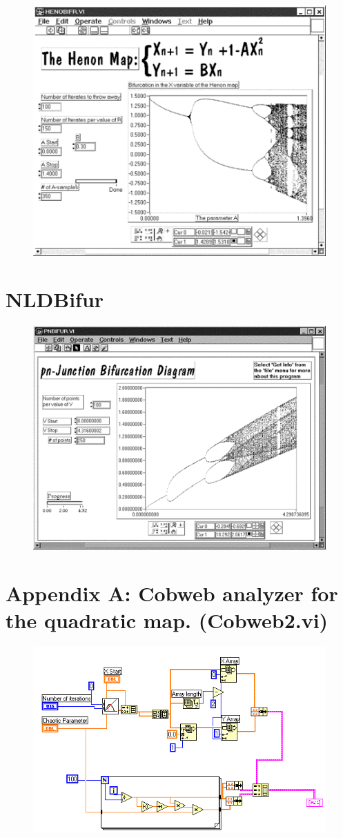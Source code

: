 \documentclass{../lab}
\begin{document}
\begin{figure}[h]
    \centering
    \href{http://experimentationlab.berkeley.edu/sites/default/files/images/Nldimage139.gif}{\includegraphics[width=0.5\linewidth]{images/Nldimage139.png}}
    \caption{}
    \label{fig:Nldimage139}
\end{figure}

\section{NLDBifur}


\begin{figure}[h]
    \centering
    \href{http://experimentationlab.berkeley.edu/sites/default/files/images/Nldimage140.gif}{\includegraphics[width=0.5\linewidth]{images/Nldimage140.png}}
    \caption{}
    \label{fig:Nldimage140}
\end{figure}

\section{Appendix A: Cobweb analyzer for the quadratic map. (Cobweb2.vi)}


\begin{figure}[h]
    \centering
    \href{http://experimentationlab.berkeley.edu/sites/default/files/images/Nldimage141.gif}{\includegraphics[width=0.5\linewidth]{images/Nldimage141.png}}
    \caption{}
    \label{fig:Nldimage141}
\end{figure}
\end{document}
